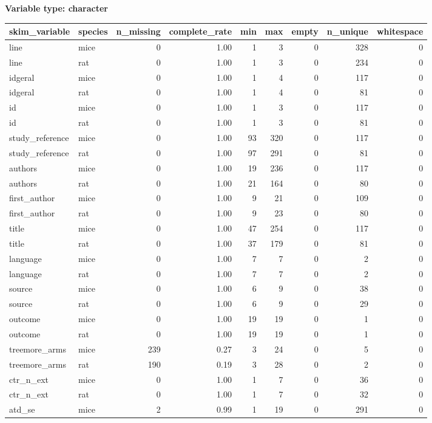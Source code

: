 \documentclass[
]{article}
\begin{document}
\textbf{Variable type: character}

\begin{longtable}[]{@{}llrrrrrrr@{}}
\toprule
skim\_variable & species & n\_missing & complete\_rate & min & max &
empty & n\_unique & whitespace \\
\midrule
\endhead
line & mice & 0 & 1.00 & 1 & 3 & 0 & 328 & 0 \\
line & rat & 0 & 1.00 & 1 & 3 & 0 & 234 & 0 \\
idgeral & mice & 0 & 1.00 & 1 & 4 & 0 & 117 & 0 \\
idgeral & rat & 0 & 1.00 & 1 & 4 & 0 & 81 & 0 \\
id & mice & 0 & 1.00 & 1 & 3 & 0 & 117 & 0 \\
id & rat & 0 & 1.00 & 1 & 3 & 0 & 81 & 0 \\
study\_reference & mice & 0 & 1.00 & 93 & 320 & 0 & 117 & 0 \\
study\_reference & rat & 0 & 1.00 & 97 & 291 & 0 & 81 & 0 \\
authors & mice & 0 & 1.00 & 19 & 236 & 0 & 117 & 0 \\
authors & rat & 0 & 1.00 & 21 & 164 & 0 & 80 & 0 \\
first\_author & mice & 0 & 1.00 & 9 & 21 & 0 & 109 & 0 \\
first\_author & rat & 0 & 1.00 & 9 & 23 & 0 & 80 & 0 \\
title & mice & 0 & 1.00 & 47 & 254 & 0 & 117 & 0 \\
title & rat & 0 & 1.00 & 37 & 179 & 0 & 81 & 0 \\
language & mice & 0 & 1.00 & 7 & 7 & 0 & 2 & 0 \\
language & rat & 0 & 1.00 & 7 & 7 & 0 & 2 & 0 \\
source & mice & 0 & 1.00 & 6 & 9 & 0 & 38 & 0 \\
source & rat & 0 & 1.00 & 6 & 9 & 0 & 29 & 0 \\
outcome & mice & 0 & 1.00 & 19 & 19 & 0 & 1 & 0 \\
outcome & rat & 0 & 1.00 & 19 & 19 & 0 & 1 & 0 \\
treemore\_arms & mice & 239 & 0.27 & 3 & 24 & 0 & 5 & 0 \\
treemore\_arms & rat & 190 & 0.19 & 3 & 28 & 0 & 2 & 0 \\
ctr\_n\_ext & mice & 0 & 1.00 & 1 & 7 & 0 & 36 & 0 \\
ctr\_n\_ext & rat & 0 & 1.00 & 1 & 7 & 0 & 32 & 0 \\
atd\_se & mice & 2 & 0.99 & 1 & 19 & 0 & 291 & 0 \\

\end{longtable}
\end{document}
